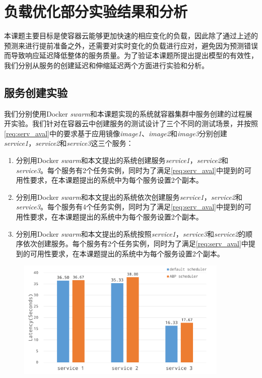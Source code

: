 \section{负载优化部分实验结果和分析}
本课题主要目标是使容器云能够更加快速的相应变化的负载，因此除了通过上述的预测来进行提前准备之外，还需要对实时变化的负载进行应对，避免因为预测错误而导致响应延迟降低整体的服务质量。为了验证本课题所提出提出模型的有效性，我们分别从服务的创建延迟和伸缩延迟两个方面进行实验和分析。

\subsection{服务创建实验}\label{sec:serv_creation}
我们分别使用Docker \emph{swarm}和本课题实现的系统就容器集群中服务创建的过程展开实验。我们针对在容器云中创建服务的测试设计了三个不同的测试场景，并按照\ref{req:serv_aval}中的要求基于应用镜像\emph{image1}、\emph{image2}和\emph{image3}分别创建\emph{service1}，\emph{service2}和\emph{service3}这三个服务：
\begin{enumerate}
\item\label{create1} 分别用Docker \emph{swarm}和本文提出的系统创建服务\emph{service1}，\emph{service2}和\emph{service3}。每个服务有2个任务实例，同时为了满足\ref{req:serv_aval}中提到的可用性要求，在本课题提出的系统中为每个服务设置2个副本。
\item\label{create2} 分别用Docker \emph{swarm}和本文提出的系统依次创建服务\emph{service1}，\emph{service2}和\emph{service3}。每个服务有4个任务实例，同时为了满足\ref{req:serv_aval}中提到的可用性要求，在本课题提出的系统中为每个服务设置2个副本。
\item\label{create3} 分别用Docker \emph{swarm}和本文提出的系统按照\emph{service1}，\emph{service3}和\emph{service2}的顺序依次创建服务。每个服务有2个任务实例，同时为了满足\ref{req:serv_aval}中提到的可用性要求，在本课题提出的系统中为每个服务设置2个副本。
\end{enumerate}

\begin{figure}[htbp]
\centering
\includegraphics[width=0.9\textwidth]{./figure/baseline}
\end{figure}

